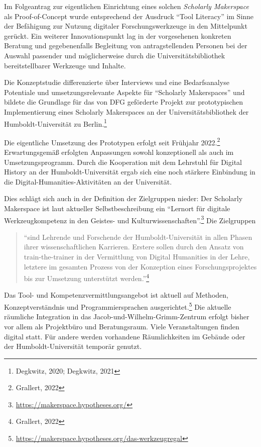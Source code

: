 \documentclass[a4paper,
fontsize=11pt,
oneside,
numbers=noperiodatend,
parskip=half-,
bibliography=totoc,
final
]{scrartcl}
\begin{document}
Im Folgeantrag zur eigentlichen Einrichtung eines solchen
\emph{Scholarly Makerspace} als Proof-of-Concept wurde entsprechend der
Ausdruck \enquote{Tool Literacy} im Sinne der Befähigung zur Nutzung
digitaler Forschungswerkzeuge in den Mittelpunkt gerückt. Ein weiterer
Innovationspunkt lag in der vorgesehenen konkreten Beratung und
gegebenenfalls Begleitung von antragstellenden Personen bei der Auswahl
passender und möglicherweise durch die Universitätsbibliothek
bereitstellbarer Werkzeuge und Inhalte.

Die Konzeptstudie differenzierte über Interviews und eine Bedarfsanalyse
Potentiale und umsetzungsrelevante Aspekte für \enquote{Scholarly
Makerspaces} und bildete die Grundlage für das von DFG geförderte
Projekt zur prototypischen Implementierung eines Scholarly Makerspaces
an der Universitätsbibliothek der Humboldt-Universität zu
Berlin.\footnote{Degkwitz, 2020; Degkwitz, 2021}

Die eigentliche Umsetzung des Prototypen erfolgt seit Frühjahr
2022.\footnote{Grallert, 2022} Erwartungsgemäß erfolgten Anpassungen
sowohl konzeptionell als auch im Umsetzungsprogramm. Durch die
Kooperation mit dem Lehrstuhl für Digital History an der
Humboldt-Universität ergab sich eine noch stärkere Einbindung in die
Digital-Humanities-Aktivitäten an der Universität.

Dies schlägt sich auch in der Definition der Zielgruppen nieder: Der
Scholarly Makerspace ist laut aktueller Selbstbeschreibung ein
\enquote{Lernort für digitale Werkzeugkompetenz in den Geistes- und
Kulturwissenschaften}.\footnote{\url{https://makerspace.hypotheses.org/}}
Die Zielgruppen

\begin{quote}
\enquote{sind Lehrende und Forschende der Humboldt-Universität in allen
Phasen ihrer wissenschaftlichen Karrieren. Erstere sollen durch den
Ansatz von train-the-trainer in der Vermittlung von Digital Humanities
in der Lehre, letztere im gesamten Prozess von der Konzeption eines
Forschungsprojektes bis zur Umsetzung unterstützt werden.}\footnote{Grallert,
  2022}
\end{quote}

Das Tool- und Kompetenzvermittlungsangebot ist aktuell auf Methoden,
Konzeptverständnis und Programmiersprachen ausgerichtet.\footnote{\url{https://makerspace.hypotheses.org/das-werkzeugregal}}
Die aktuelle räumliche Integration in das
Jacob-und-Wilhelm-Grimm-Zentrum erfolgt bisher vor allem als Projektbüro
und Beratungsraum. Viele Veranstaltungen finden digital statt. Für
andere werden vorhandene Räumlichkeiten im Gebäude oder der
Humboldt-Universität temporär genutzt.
\end{document}
